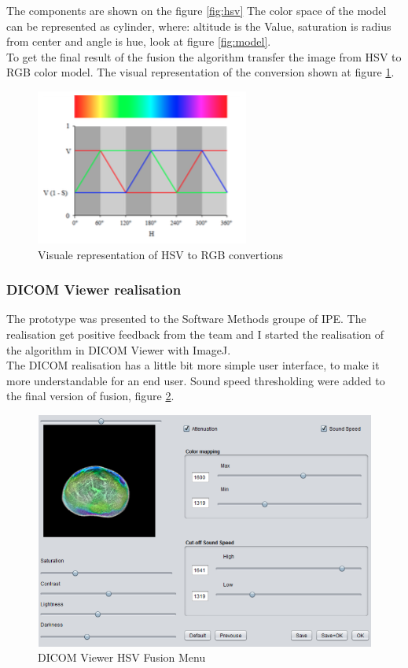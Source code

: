 \documentclass[english]{article}
\begin{document}
The components are shown on the figure \ref{fig:hsv} The color space of the model can be represented as cylinder, where: altitude is the Value, saturation is radius from center and angle is hue, look at figure \ref{fig:model}.\\
To get the final result of the fusion the algorithm transfer the image from HSV to RGB color model. The visual representation of the conversion shown at figure \ref{fig:hsv2rgb}.

\begin{figure}[H]
\centerline{\includegraphics[scale=0.7]{internship_report/hsv2rgb}}
\caption{Visuale representation of HSV to RGB convertions\label{fig:hsv2rgb}}
\end{figure}

\subsubsection{DICOM Viewer realisation}

The prototype was presented to the Software Methods groupe of IPE. The realisation get positive feedback from the team and I started the realisation of the algorithm in DICOM Viewer with ImageJ.\\


The DICOM realisation has a little bit more simple user interface, to make it more understandable for an end user. Sound speed thresholding were added to the final version of fusion, figure \ref{fig:final}.

\begin{figure}
\centerline{\includegraphics[scale=0.5]{internship_report/final}}
\caption{DICOM Viewer HSV Fusion Menu \label{fig:final}}
\end{figure}
\end{document}
